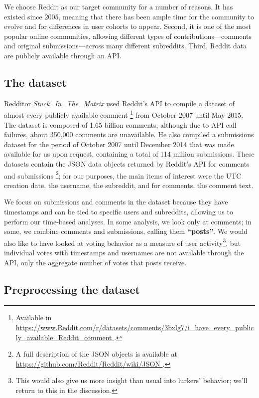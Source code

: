 We choose Reddit as our target community for a number of reasons.  It has existed since 2005, meaning that there has been ample time for the community to evolve and for differences in user cohorts to appear.  Second, it is one of the most popular online communities, allowing different types of contributions---comments and original submissions---across many different subreddits.%
Third, Reddit data are publicly available through an API.

\subsection{The dataset}

Redditor \textit{Stuck\_In\_The\_Matrix} used Reddit's API to compile a dataset of almost every publicly available comment \footnote{Available in \url{https://www.Reddit.com/r/datasets/comments/3bxlg7/i_have_every_publicly_available_Reddit_comment }.} from October 2007 until May 2015.  The dataset is composed of 1.65 billion comments, although due to API call failures, about 350,000 comments are unavailable.  He also compiled a submissions dataset for the period of October 2007 until December 2014 that was made available for us upon request, containing a total of 114 million submissions.  These datasets contain the JSON data objects returned by Reddit's API for comments and submissions \footnote{A full description of the JSON objects is available at \url{https://github.com/Reddit/Reddit/wiki/JSON }.}; for our purposes, the main items of interest were the UTC creation date, the username, the subreddit, and for comments, the comment text.

We focus on submissions and comments in the dataset because they have timestamps and can be tied to specific users and subreddits, allowing us to perform our time-based analyses.   In some analysis, we look only at comments; in some, we combine comments and submissions, calling them \textbf{``posts''}.  We would also like to have looked at voting behavior as a measure of user activity\footnote{This would also give us more insight than usual into lurkers' behavior; we'll return to this in the discussion.}, but individual votes with timestamps and usernames are not available through the API, only the aggregate number of votes that posts receive.

\subsection{Preprocessing the dataset}

